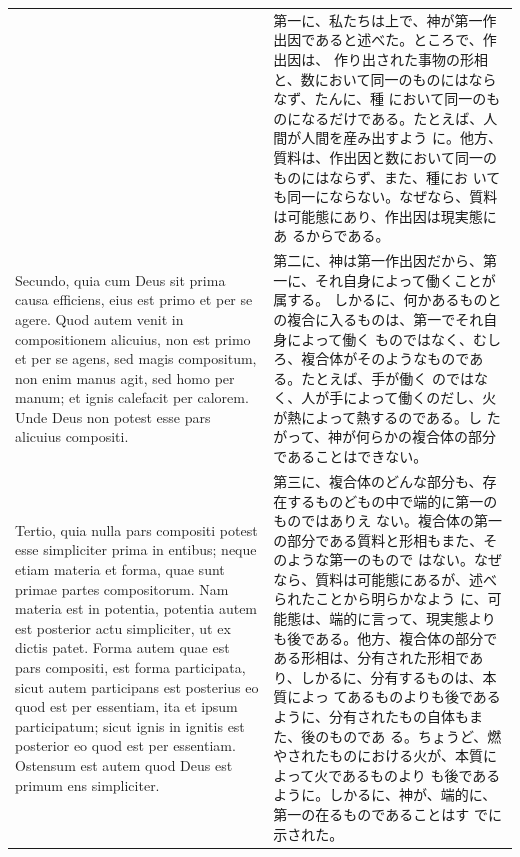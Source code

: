 \documentclass[paper=a4paper,fontsize=10pt,jafontsize=9pt,titlepage]{jlreq}
\begin{document}
\begin{longtable}{p{21em}p{21em}}
&

第一に、私たちは上で、神が第一作出因であると述べた。ところで、作出因は、
 作り出された事物の形相と、数において同一のものにはならなず、たんに、種
 において同一のものになるだけである。たとえば、人間が人間を産み出すよう
 に。他方、質料は、作出因と数において同一のものにはならず、また、種にお
 いても同一にならない。なぜなら、質料は可能態にあり、作出因は現実態にあ
 るからである。

\\


Secundo, quia cum Deus sit prima causa efficiens, eius est primo et per
 se agere. Quod autem venit in compositionem alicuius, non est primo et
 per se agens, sed magis compositum, non enim manus agit, sed homo per
 manum; et ignis calefacit per calorem. Unde Deus non potest esse pars
 alicuius compositi.

&

第二に、神は第一作出因だから、第一に、それ自身によって働くことが属する。
 しかるに、何かあるものとの複合に入るものは、第一でそれ自身によって働く
 ものではなく、むしろ、複合体がそのようなものである。たとえば、手が働く
 のではなく、人が手によって働くのだし、火が熱によって熱するのである。し
 たがって、神が何らかの複合体の部分であることはできない。

\\

Tertio, quia nulla pars compositi potest esse simpliciter prima in
 entibus; neque etiam materia et forma, quae sunt primae partes
 compositorum. Nam materia est in potentia, potentia autem est posterior
 actu simpliciter, ut ex dictis patet. Forma autem quae est pars
 compositi, est forma participata, sicut autem participans est posterius
 eo quod est per essentiam, ita et ipsum participatum; sicut ignis in
 ignitis est posterior eo quod est per essentiam. Ostensum est autem
 quod Deus est primum ens simpliciter.

&

第三に、複合体のどんな部分も、存在するものどもの中で端的に第一のものではありえ
 ない。複合体の第一の部分である質料と形相もまた、そのような第一のもので
 はない。なぜなら、質料は可能態にあるが、述べられたことから明らかなよう
 に、可能態は、端的に言って、現実態よりも後である。他方、複合体の部分で
 ある形相は、分有された形相であり、しかるに、分有するものは、本質によっ
 てあるものよりも後であるように、分有されたもの自体もまた、後のものであ
 る。ちょうど、燃やされたものにおける火が、本質によって火であるものより
 も後であるように。しかるに、神が、端的に、第一の在るものであることはす
 でに示された。


\end{longtable}
\end{document}
